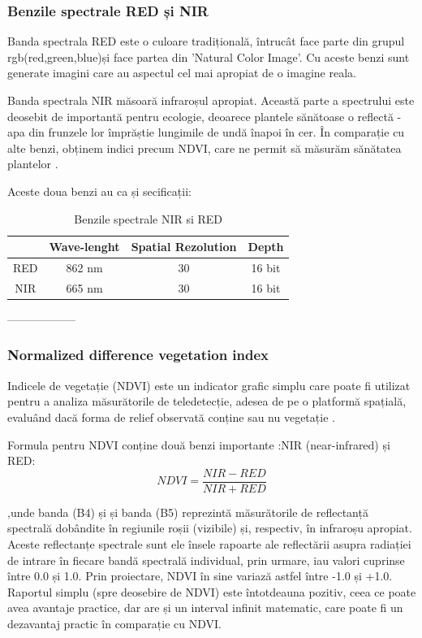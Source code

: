 \documentclass[12pt,a4paper]{article}
\theoremstyle{definition}
\theoremstyle{remark}
\begin{document}
\subsubsection{Benzile spectrale RED și NIR}

Banda spectrala RED este o culoare tradițională, întrucât face parte din grupul rgb(red,green,blue)și face partea din 'Natural Color Image'. Cu aceste benzi sunt generate imagini care au aspectul cel mai apropiat de o imagine reala.


Banda spectrala NIR măsoară infraroșul apropiat. Această parte a spectrului este deosebit de importantă pentru ecologie, deoarece plantele sănătoase o reflectă - apa din frunzele lor împrăștie lungimile de undă înapoi în cer. În comparație cu alte benzi, obținem indici precum NDVI, care ne permit să măsurăm sănătatea plantelor \cite{rednir}.

Aceste doua benzi au ca și secificații:

\begin{table}[ht]
\caption{Benzile spectrale NIR si RED\cite{rednir}} %
\centering %
\begin{tabular}{c c c c} %
\hline\hline %
 & Wave-lenght & Spatial Rezolution & Depth\\ [0.5ex] %
\hline %
RED& 862 nm & 30 & 16 bit \\ %
NIR & 665 nm & 30 & 16 bit\\
\hline %
\end{tabular}
\label{table:nonlin} %
\end{table}
------------------


\subsubsection{Normalized difference vegetation index}


Indicele de vegetație (NDVI) este un indicator grafic simplu care poate fi utilizat pentru a analiza măsurătorile de teledetecție, adesea de pe o platformă spațială, evaluând dacă forma de relief observată conține sau nu vegetație \cite{ndvi}.

 Formula pentru NDVI conține două benzi importante :NIR (near-infrared) și  RED:
    $$ NDVI = \frac{NIR-RED}{NIR+RED} $$
    
  ,unde banda (B4) și și banda (B5) reprezintă măsurătorile de reflectanță spectrală dobândite în regiunile roșii (vizibile) și, respectiv, în infraroșu apropiat.  Aceste reflectanțe spectrale sunt ele însele rapoarte ale reflectării asupra radiației de intrare în fiecare bandă spectrală individual, prin urmare, iau valori cuprinse între 0.0 și 1.0. Prin proiectare, NDVI în sine variază astfel între -1.0 și +1.0. Raportul simplu (spre deosebire de NDVI) este întotdeauna pozitiv, ceea ce poate avea avantaje practice, dar are și un interval infinit matematic, care poate fi un dezavantaj practic în comparație cu NDVI.\cite{ndvi}
  
\end{document}

